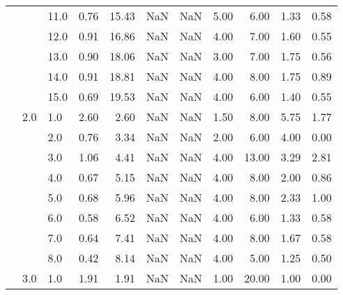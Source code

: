 \begin{tabular}{lllrrrrrrrr}
       &     & 11.0 &      0.76 &      15.43 &               NaN &                NaN & 5.00 &   6.00 &             1.33 &                         0.58 \\
       &     & 12.0 &      0.91 &      16.86 &               NaN &                NaN & 4.00 &   7.00 &             1.60 &                         0.55 \\
       &     & 13.0 &      0.90 &      18.06 &               NaN &                NaN & 3.00 &   7.00 &             1.75 &                         0.56 \\
       &     & 14.0 &      0.91 &      18.81 &               NaN &                NaN & 4.00 &   8.00 &             1.75 &                         0.89 \\
       &     & 15.0 &      0.69 &      19.53 &               NaN &                NaN & 4.00 &   6.00 &             1.40 &                         0.55 \\
       & 2.0 & 1.0  &      2.60 &       2.60 &               NaN &                NaN & 1.50 &   8.00 &             5.75 &                         1.77 \\
       &     & 2.0  &      0.76 &       3.34 &               NaN &                NaN & 2.00 &   6.00 &             4.00 &                         0.00 \\
       &     & 3.0  &      1.06 &       4.41 &               NaN &                NaN & 4.00 &  13.00 &             3.29 &                         2.81 \\
       &     & 4.0  &      0.67 &       5.15 &               NaN &                NaN & 4.00 &   8.00 &             2.00 &                         0.86 \\
       &     & 5.0  &      0.68 &       5.96 &               NaN &                NaN & 4.00 &   8.00 &             2.33 &                         1.00 \\
       &     & 6.0  &      0.58 &       6.52 &               NaN &                NaN & 4.00 &   6.00 &             1.33 &                         0.58 \\
       &     & 7.0  &      0.64 &       7.41 &               NaN &                NaN & 4.00 &   8.00 &             1.67 &                         0.58 \\
       &     & 8.0  &      0.42 &       8.14 &               NaN &                NaN & 4.00 &   5.00 &             1.25 &                         0.50 \\
       & 3.0 & 1.0  &      1.91 &       1.91 &               NaN &                NaN & 1.00 &  20.00 &             1.00 &                         0.00 \\
\bottomrule
\end{tabular}
